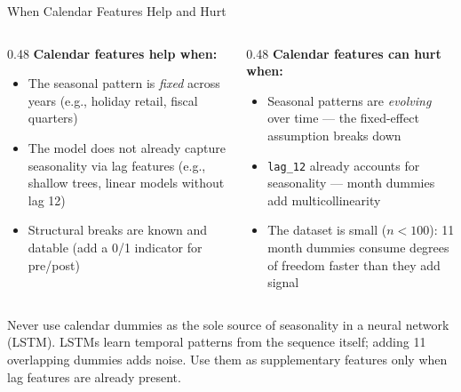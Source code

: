 \documentclass[aspectratio=169, 10pt]{beamer}
\begin{document}
\begin{frame}{When Calendar Features Help and Hurt}
  \begin{columns}[T]
    \begin{column}{0.48\textwidth}
      \textbf{Calendar features help when:}
      \begin{itemize}
        \item The seasonal pattern is \emph{fixed} across years
              (e.g., holiday retail, fiscal quarters)
        \item The model does not already capture seasonality
              via lag features (e.g., shallow trees, linear
              models without lag 12)
        \item Structural breaks are known and datable
              (add a 0/1 indicator for pre/post)
      \end{itemize}
    \end{column}
    \begin{column}{0.48\textwidth}
      \textbf{Calendar features can hurt when:}
      \begin{itemize}
        \item Seasonal patterns are \emph{evolving} over time
              --- the fixed-effect assumption breaks down
        \item \texttt{lag\_12} already accounts for
              seasonality --- month dummies add multicollinearity
        \item The dataset is small ($n < 100$): 11 month
              dummies consume degrees of freedom faster than
              they add signal
      \end{itemize}
    \end{column}
  \end{columns}

  \medskip
  \begin{warningbox}
    Never use calendar dummies as the sole source of seasonality
    in a neural network (LSTM). LSTMs learn temporal patterns from
    the sequence itself; adding 11 overlapping dummies adds noise.
    Use them as supplementary features only when lag features are
    already present.
  \end{warningbox}
\end{frame}

\end{document}
